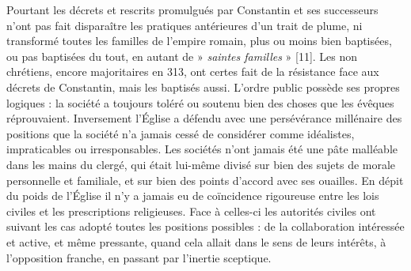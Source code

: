  Pourtant les décrets et rescrits promulgués par Constantin et ses successeurs n'ont pas fait disparaître les pratiques antérieures d'un trait de plume, ni transformé toutes les familles de l'empire romain, plus ou moins bien baptisées, ou pas baptisées du tout, en autant de » \emph{saintes familles} » [11]. Les non chrétiens, encore majoritaires en 313, ont certes fait de la résistance face aux décrets de Constantin, mais les baptisés aussi. L'ordre public possède ses propres logiques : la société a toujours toléré ou soutenu bien des choses que les évêques réprouvaient. Inversement l'Église a défendu avec une persévérance millénaire des positions que la société n'a jamais cessé de considérer comme idéalistes, impraticables ou irresponsables. Les sociétés n'ont jamais été une pâte malléable dans les mains du clergé, qui était lui-même divisé sur bien des sujets de morale personnelle et familiale, et sur bien des points d'accord avec ses ouailles. En dépit du poids de l'Église il n'y a jamais eu de coïncidence rigoureuse entre les lois civiles et les prescriptions religieuses. Face à celles-ci les autorités civiles ont suivant les cas adopté toutes les positions possibles : de la collaboration intéressée et active, et même pressante, quand cela allait dans le sens de leurs intérêts, à l'opposition franche, en passant par l'inertie sceptique. 
 
